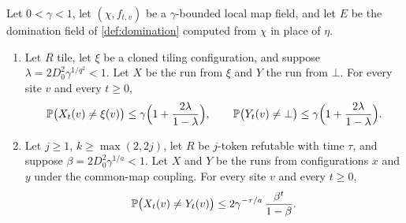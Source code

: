 \begin{lemma}\label{pf:field}
Let $0<\gamma<1$, let $(\chi,f_{t,v})$ be a $\gamma$-bounded local map field, and
let $E$ be the domination field of \cref{def:domination} computed from $\chi$ in
place of $\eta$.
\begin{enumerate}[label=\textup{(\roman*)}]
\item Let $R$ tile, let $\xi$ be a cloned tiling configuration, and suppose
$\lambda=2D_0^2\gamma^{1/q^2}<1$. Let $X$ be the run from $\xi$ and $Y$ the run from
$\bot$. For every site $v$ and every $t\ge0$,
\[
\mathbb{P}\bigl(X_t(v)\ne\xi(v)\bigr)\le\gamma\Bigl(1+\frac{2\lambda}{1-\lambda}\Bigr),
\qquad
\mathbb{P}\bigl(Y_t(v)\ne\bot\bigr)\le\gamma\Bigl(1+\frac{2\lambda}{1-\lambda}\Bigr).
\]
\item Let $j\ge1$, $k\ge\max(2,2j)$, let $R$ be $j$-token refutable with time
$\tau$, and suppose $\beta=2D_0^2\gamma^{1/a}<1$. Let $X$ and $Y$ be the runs from
configurations $x$ and $y$ under the common-map coupling. For every site $v$ and
every $t\ge0$,
\[
\mathbb{P}\bigl(X_t(v)\ne Y_t(v)\bigr)\le2\gamma^{-\tau/a}\,\frac{\beta^t}{1-\beta}.
\]
\end{enumerate}
\end{lemma}

